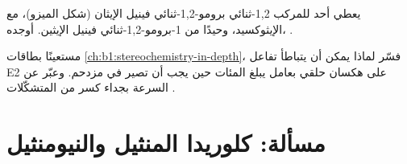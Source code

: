\begin{exercise}[$\star\star\star$]\label{exo:b1:elimination:11}
يعطي أحد  للمركب 1,2-ثنائي برومو-1,2-ثنائي فينيل الإيثان (شكل الميزو)،
 مع الإيثوكسيد،  وحيدًا من 1-برومو-1,2-ثنائي فينيل الإيثين.
أوجده، .
\end{exercise}

\begin{exercise}[$\star\star\star$]\label{exo:b1:elimination:12}
مستعينًا بطاقات \cref{ch:b1:stereochemistry-in-depth}، فسّر لماذا
يمكن أن يتباطأ تفاعل E2 على هكسان حلقي بعامل يبلغ المئات
حين يجب أن تصير   في  مزدحم. وعبّر عن
السرعة بجداء كسر من المتشكّلات .
\end{exercise}

\section{مسألة: كلوريدا المنثيل والنيومنثيل}

